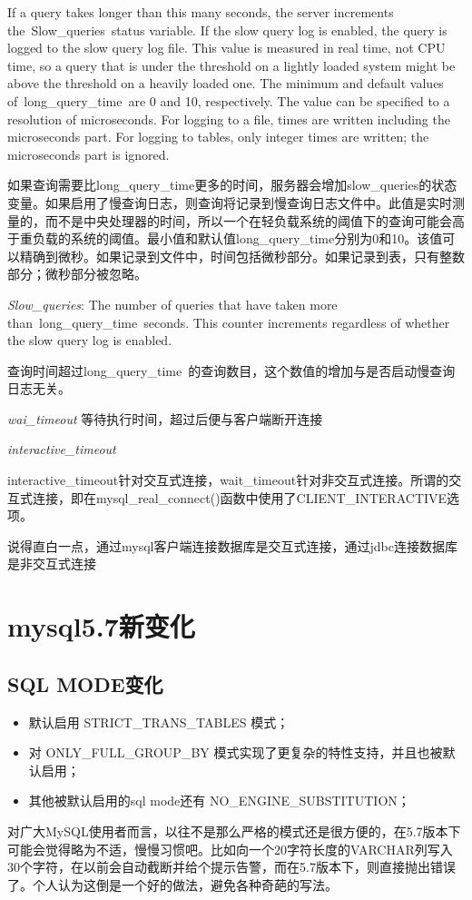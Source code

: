 If a query takes longer than this many seconds, the server increments the Slow_queries status variable. If the slow query log is enabled, the query is logged to the slow query log file. This value is measured in real time, not CPU time, so a query that is under the threshold on a lightly loaded system might be above the threshold on a heavily loaded one. The minimum and default values of long_query_time are 0 and 10, respectively. The value can be specified to a resolution of microseconds. For logging to a file, times are written including the microseconds part. For logging to tables, only integer times are written; the microseconds part is ignored. 

如果查询需要比long_query_time更多的时间，服务器会增加slow_queries的状态变量。如果启用了慢查询日志，则查询将记录到慢查询日志文件中。此值是实时测量的，而不是中央处理器的时间，所以一个在轻负载系统的阈值下的查询可能会高于重负载的系统的阈值。最小值和默认值long_query_time分别为0和10。该值可以精确到微秒。如果记录到文件中，时间包括微秒部分。如果记录到表，只有整数部分；微秒部分被忽略。

\textit{Slow_queries}:
The number of queries that have taken more than long_query_time seconds. This counter increments regardless of whether the slow query log is enabled.

查询时间超过long_query_time 的查询数目，这个数值的增加与是否启动慢查询日志无关。

\textit{wai_timeout}
等待执行时间，超过后便与客户端断开连接

\textit{interactive_timeout}

interactive_timeout针对交互式连接，wait_timeout针对非交互式连接。所谓的交互式连接，即在mysql_real_connect()函数中使用了CLIENT_INTERACTIVE选项。

   说得直白一点，通过mysql客户端连接数据库是交互式连接，通过jdbc连接数据库是非交互式连接
     
\section{mysql5.7新变化}

\subsection{SQL MODE变化}
\begin{itemize}
\item 默认启用 STRICT_TRANS_TABLES 模式；
\item 对 ONLY_FULL_GROUP_BY 模式实现了更复杂的特性支持，并且也被默认启用；
\item 其他被默认启用的sql mode还有 NO_ENGINE_SUBSTITUTION；
\end{itemize}
对广大MySQL使用者而言，以往不是那么严格的模式还是很方便的，在5.7版本下可能会觉得略为不适，慢慢习惯吧。比如向一个20字符长度的VARCHAR列写入30个字符，在以前会自动截断并给个提示告警，而在5.7版本下，则直接抛出错误了。个人认为这倒是一个好的做法，避免各种奇葩的写法。

